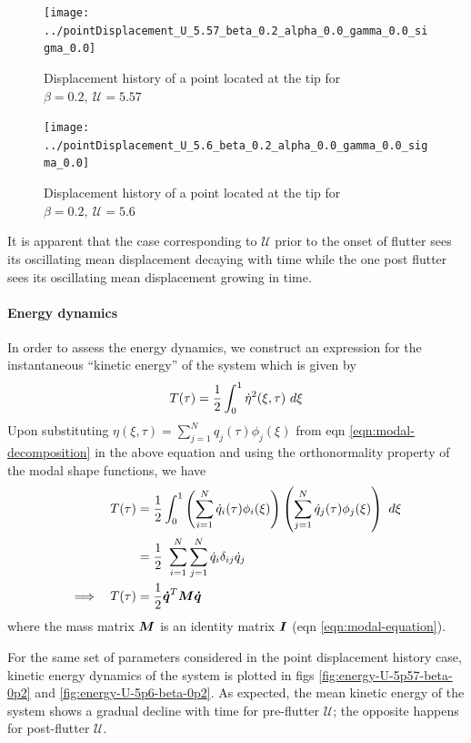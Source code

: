 \documentclass[12pt]{report}
\begin{document}
\begin{figure}[h!]
	\centering
	\texttt{[image: ../pointDisplacement\_U\_5.57\_beta\_0.2\_alpha\_0.0\_gamma\_0.0\_sigma\_0.0]}
	\caption{Displacement history of a point located at the tip for $\beta = 0.2, ~\mathcal{U} = 5.57$}
	\label{fig:point-displacement-U-5p57-beta-0p2}
\end{figure}

\begin{figure}[h!]
	\centering
	\texttt{[image: ../pointDisplacement\_U\_5.6\_beta\_0.2\_alpha\_0.0\_gamma\_0.0\_sigma\_0.0]}
	\caption{Displacement history of a point located at the tip for $\beta = 0.2, ~\mathcal{U} = 5.6$}
	\label{fig:point-displacement-U-5p6-beta-0p2}
\end{figure}
It is apparent that the case corresponding to $\mathcal{U}$ prior to the onset of flutter sees its oscillating mean displacement decaying with time while the one post flutter sees its oscillating mean displacement growing in time.

\paragraph{Energy dynamics} In order to assess the energy dynamics, we construct an expression for the instantaneous ``kinetic energy'' of the system which is given by
\begin{align}
  T (\tau) = \frac{1}{2} \int_0^1 \dot{\eta}^2 (\xi, \tau) ~d\xi \notag
\end{align}
Upon substituting $\eta(\xi, \tau) = \sum_{j=1}^N q_j (\tau)\phi_j (\xi)$ from eqn \ref{eqn:modal-decomposition} in the above equation and using the orthonormality property of the modal shape functions, we have
\begin{align}
T (\tau) &= \frac{1}{2} \int_0^1 \left(\sum_{i=1}^N \dot{q}_i (\tau)\phi_i (\xi)\right)\left(\sum_{j=1}^N \dot{q}_j (\tau)\phi_j (\xi)\right) ~d\xi \notag  \\
   &= \frac{1}{2}~\sum_{i=1}^N\sum_{j=1}^N \dot{q}_i\delta_{ij}\dot{q}_j \notag \\
\implies~~ T (\tau)  &= \frac{1}{2}\vb*{\dot{q}}^T\vb*{M}\vb*{\dot{q}}
\end{align}
where the mass matrix $\vb*{M}$ is an identity matrix $\vb*{I}$ (eqn \ref{eqn:modal-equation}).

For the same set of parameters considered in the point displacement history case, kinetic energy dynamics of the system is plotted in figs \ref{fig:energy-U-5p57-beta-0p2} and \ref{fig:energy-U-5p6-beta-0p2}. As expected, the mean kinetic energy of the system shows a gradual decline with time for pre-flutter $\mathcal{U}$; the opposite happens for post-flutter $\mathcal{U}$.
\end{document}
